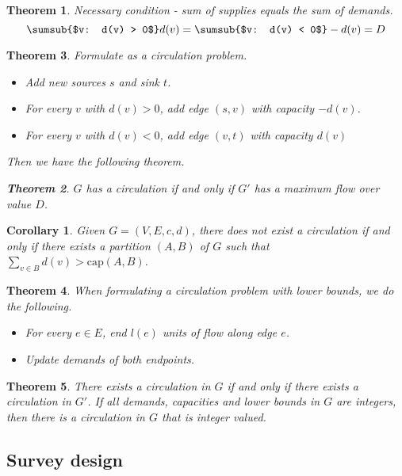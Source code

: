 \documentclass[10pt, oneside, reqno]{amsart}
\theoremstyle{plain}%
\newtheorem{thm}{Theorem}[section]
\newtheorem*{cor}{Corollary}
\theoremstyle{definition}
\theoremstyle{remark}
\begin{document}
\begin{thm}
    Necessary condition - sum of supplies equals the sum of demands.
    \[
        \sumsub{$v: d(v) > 0$} d(v) = \sumsub{$v: d(v) < 0$} -d(v) = D
    \]
\end{thm}

\begin{thm}
    Formulate as a circulation problem.
    \begin{itemize}
        \item Add new sources $s$ and sink $t$.
        \item For every $v$ with $d(v) > 0$, add edge $(s,v)$ with capacity $-d(v)$.
        \item For every $v$ with $d(v) < 0$, add edge $(v,t)$ with capacity $d(v)$
    \end{itemize}
    
    Then we have the following theorem.
    \begin{thm}
        $G$ has a circulation if and only if $G'$ has a maximum flow over value $D$.
    \end{thm}
\end{thm}

\begin{cor}
    Given $G = (V,E,c,d)$, there does not exist a circulation if and only if there exists a partition $(A,B)$ of $G$ such that $\sum_{v \in B} d(v) > \text{cap}(A,B)$.
\end{cor}

\begin{thm}
    When formulating a circulation problem with lower bounds, we do the following.
    \begin{itemize}
        \item For every $e \in E$, end $l(e)$ units of flow along edge $e$.
        \item Update demands of both endpoints.
    \end{itemize}
\end{thm}
\begin{thm}
    There exists a circulation in $G$ if and only if there exists a circulation in $G'$.  If all demands, capacities and lower bounds in $G$ are integers, then there is a circulation in $G$ that is integer valued.
\end{thm}

\subsection{Survey design} %
\label{sub:survey_design}
\end{document}
